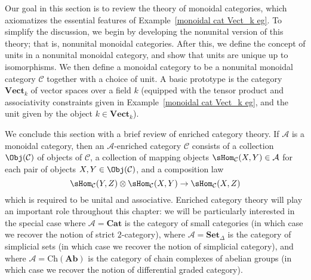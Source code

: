 Our goal in this section is to review the theory of monoidal categories, which axiomatizes the essential features of Example~\ref{monoidal cat Vect_k eg}. To simplify the discussion, we begin by developing the nonunital version of this theory; that is, nonunital monoidal categories. After this, we define the concept of units in a nonunital monoidal category, and show that units are unique up to isomorphisms. We then define a monoidal category to be a nonunital monoidal category $\mathcal{C}$ together with a choice of unit. A basic prototype is the category $\mathbf{Vect}_k$ of vector spaces over a field $k$ (equipped with the tensor product and associativity constraints given in Example~\ref{monoidal cat Vect_k eg}, and the unit given by the object $k\in\mathbf{Vect}_k$).\par
We conclude this section with a brief review of enriched category theory. If $\mathcal{A}$ is a monoidal category, then an $\mathcal{A}$-enriched category $\mathcal{C}$ consists of a collection $\Obj(\mathcal{C})$ of objects of $\mathcal{C}$, a collection of mapping objects $\sHom_{\mathcal{C}}(X,Y)\in\mathcal{A}$ for each pair of objects $X,Y\in\Obj(\mathcal{C})$, and a composition law
\[\sHom_{\mathcal{C}}(Y,Z)\otimes\sHom_{\mathcal{C}}(X,Y)\to\sHom_{\mathcal{C}}(X,Z)\]
which is required to be unital and associative. Enriched category theory will play an important role throughout this chapter: we will be particularly interested in the special case where $\mathcal{A}=\mathbf{Cat}$ is the category of small categories (in which case we recover the notion of strict $2$-category), where $\mathcal{A}=\mathbf{Set}_\Delta$ is the category of simplicial sets (in which case we recover the notion of simplicial category), and where $\mathcal{A}=\mathrm{Ch}(\mathbf{Ab})$ is the category of chain complexes of abelian groups (in which case we recover the notion of differential graded category).
